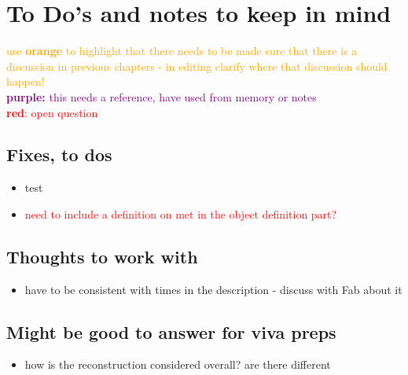 \chapter*{To Do's and notes to keep in mind}

\textcolor{orange}{use \textbf{orange} to highlight that there needs to be made sure that there is a discussion in previous chapters - in editing clarify where that discussion should happen!}\\
\textcolor{purple}{\textbf{purple:} this needs a reference,  have used from memory or notes}\\
\textcolor{red}{\textbf{red}: open question}



\section*{Fixes, to dos}
\begin{itemize}
    \item test
    \item \textcolor{red}{need to include a definition on met in the object definition part? }
\end{itemize}





\section*{Thoughts to work with}
\begin{itemize}
    \item have to be consistent with times in the description - discuss with Fab about it
\end{itemize}





\section*{Might be good to answer for viva preps}
\begin{itemize}
    \item how is the reconstruction considered overall? are there different
\end{itemize}